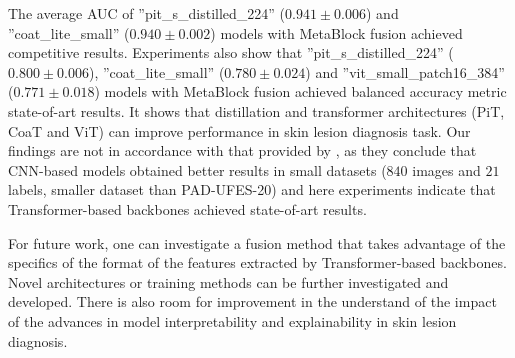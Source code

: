 \documentclass[conference]{IEEEtran}
\begin{document}
The average AUC of ''pit\_s\_distilled\_224'' ($0.941 \pm 0.006$) and ''coat\_lite\_small'' ($0.940 \pm 0.002$) models with MetaBlock fusion achieved competitive results. Experiments also show that
''pit\_s\_distilled\_224'' ($0.800 \pm 0.006$), ''coat\_lite\_small'' ($0.780 \pm 0.024$) and ''vit\_small\_patch16\_384'' ($0.771 \pm 0.018$) models with MetaBlock fusion achieved balanced accuracy metric state-of-art results. It shows that distillation and transformer architectures (PiT, CoaT and ViT) can improve performance in skin lesion diagnosis task. Our findings are not in accordance with that provided by \cite{zhao2021comparison}, as they conclude that CNN-based models obtained better results in small datasets ($840$ images and $21$ labels, smaller dataset than PAD-UFES-20) and here experiments indicate that Transformer-based backbones achieved state-of-art results. 

For future work, one can investigate a fusion method that takes advantage of the specifics of the format of the features extracted by Transformer-based backbones. Novel architectures or training methods can be further investigated and developed. There is also room for improvement in the understand of the impact of the advances in model interpretability and explainability in skin lesion diagnosis.



\end{document}
